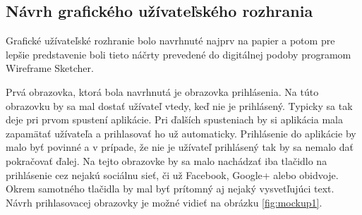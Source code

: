 \subsection{Návrh grafického užívateľského rozhrania}
Grafické užívateľské rozhranie bolo navrhnuté najprv na papier a potom pre lepšie predstavenie boli tieto náčrty prevedené do digitálnej podoby programom Wireframe Sketcher.

Prvá obrazovka, ktorá bola navrhnutá je obrazovka prihlásenia. Na túto obrazovku by sa mal dostať užívateľ vtedy, keď nie je prihlásený. Typicky sa tak deje pri prvom spustení aplikácie. Pri ďalších spusteniach by si aplikácia mala zapamätať užívateľa a prihlasovať ho už automaticky. Prihlásenie do aplikácie by malo byť povinné a v prípade, že nie je užívateľ prihlásený tak by sa nemalo dať pokračovať ďalej. Na tejto obrazovke by sa malo nachádzať iba tlačidlo na prihlásenie cez nejakú sociálnu sieť, či už Facebook, Google+ alebo obidvoje. Okrem samotného tlačidla by mal byť prítomný aj nejaký vysvetľujúci text. Návrh prihlasovacej obrazovky je možné vidieť na obrázku \ref{fig:mockup1}.
